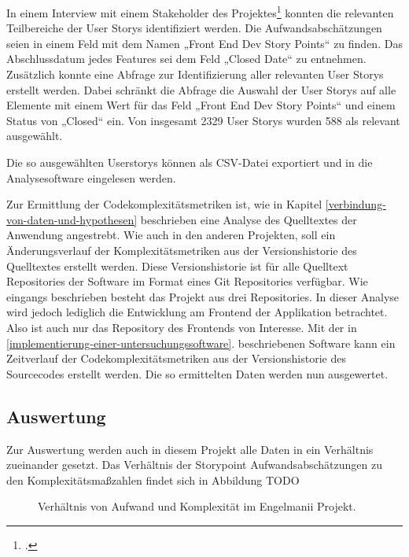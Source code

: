 In einem Interview mit einem Stakeholder des Projektes\footcite[Vgl. ][]{stakeholdernInterviewMitStakeholdern2022}
konnten die relevanten Teilbereiche der User Storys identifiziert
werden. Die Aufwandsabschätzungen seien in einem Feld mit dem Namen
„Front End Dev Story Points`` zu finden. Das Abschlussdatum jedes
Features sei dem Feld „Closed Date`` zu entnehmen. Zusätzlich konnte
eine Abfrage zur Identifizierung aller relevanten User Storys erstellt
werden. Dabei schränkt die Abfrage die Auswahl der User Storys auf alle
Elemente mit einem Wert für das Feld „Front End Dev Story Points`` und
einem Status von „Closed`` ein. Von insgesamt 2329 User Storys wurden
588 als relevant ausgewählt.

Die so ausgewählten Userstorys können als \ac{CSV}-Datei exportiert und in
die Analysesoftware eingelesen werden.

Zur Ermittlung der Codekomplexitätsmetriken ist, wie in Kapitel \ref{verbindung-von-daten-und-hypothesen}
beschrieben eine Analyse des Quelltextes der Anwendung angestrebt. Wie
auch in den anderen Projekten, soll ein Änderungsverlauf der
Komplexitätsmetriken aus der Versionshistorie des Quelltextes erstellt
werden. Diese Versionshistorie ist für alle Quelltext Repositories der
Software im Format eines Git Repositories verfügbar. Wie eingangs
beschrieben besteht das Projekt aus drei Repositories. In dieser Analyse
wird jedoch lediglich die Entwicklung am Frontend der Applikation
betrachtet. Also ist auch nur das Repository des Frontends von
Interesse. Mit der in \ref{implementierung-einer-untersuchungssoftware}. beschriebenen Software kann ein Zeitverlauf
der Codekomplexitätsmetriken aus der Versionshistorie des Sourcecodes
erstellt werden. Die so ermittelten Daten werden nun ausgewertet.

\subsection{Auswertung}\label{engelmannii-Auswertung}

Zur Auswertung werden auch in diesem Projekt alle Daten in ein
Verhältnis zueinander gesetzt. Das Verhältnis der Storypoint
Aufwandsabschätzungen zu den Komplexitätsma\ss zahlen findet sich in
Abbildung TODO

\begin{figure}\label{engelmanii-graph}
  \begin{center}
      
  \end{center}
  \caption{Verhältnis von Aufwand und Komplexität im Engelmanii Projekt.}
\end{figure}

